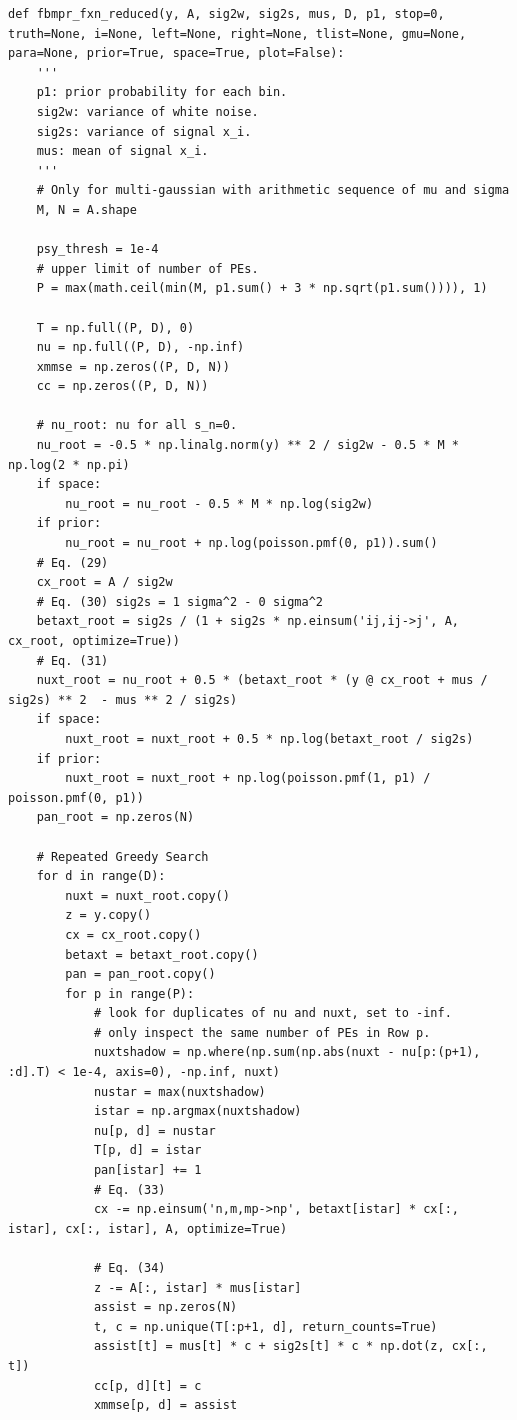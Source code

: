 \documentclass[notitlepage]{article}
\begin{document}
\begin{lstlisting}
def fbmpr_fxn_reduced(y, A, sig2w, sig2s, mus, D, p1, stop=0, truth=None, i=None, left=None, right=None, tlist=None, gmu=None, para=None, prior=True, space=True, plot=False):
    '''
    p1: prior probability for each bin.
    sig2w: variance of white noise.
    sig2s: variance of signal x_i.
    mus: mean of signal x_i.
    '''
    # Only for multi-gaussian with arithmetic sequence of mu and sigma
    M, N = A.shape

    psy_thresh = 1e-4
    # upper limit of number of PEs.
    P = max(math.ceil(min(M, p1.sum() + 3 * np.sqrt(p1.sum()))), 1)

    T = np.full((P, D), 0)
    nu = np.full((P, D), -np.inf)
    xmmse = np.zeros((P, D, N))
    cc = np.zeros((P, D, N))

    # nu_root: nu for all s_n=0.
    nu_root = -0.5 * np.linalg.norm(y) ** 2 / sig2w - 0.5 * M * np.log(2 * np.pi)
    if space:
        nu_root = nu_root - 0.5 * M * np.log(sig2w)
    if prior:
        nu_root = nu_root + np.log(poisson.pmf(0, p1)).sum()
    # Eq. (29)
    cx_root = A / sig2w
    # Eq. (30) sig2s = 1 sigma^2 - 0 sigma^2
    betaxt_root = sig2s / (1 + sig2s * np.einsum('ij,ij->j', A, cx_root, optimize=True))
    # Eq. (31)
    nuxt_root = nu_root + 0.5 * (betaxt_root * (y @ cx_root + mus / sig2s) ** 2  - mus ** 2 / sig2s)
    if space:
        nuxt_root = nuxt_root + 0.5 * np.log(betaxt_root / sig2s)
    if prior:
        nuxt_root = nuxt_root + np.log(poisson.pmf(1, p1) / poisson.pmf(0, p1))
    pan_root = np.zeros(N)

    # Repeated Greedy Search
    for d in range(D):
        nuxt = nuxt_root.copy()
        z = y.copy()
        cx = cx_root.copy()
        betaxt = betaxt_root.copy()
        pan = pan_root.copy()
        for p in range(P):
            # look for duplicates of nu and nuxt, set to -inf.
            # only inspect the same number of PEs in Row p.
            nuxtshadow = np.where(np.sum(np.abs(nuxt - nu[p:(p+1), :d].T) < 1e-4, axis=0), -np.inf, nuxt)
            nustar = max(nuxtshadow)
            istar = np.argmax(nuxtshadow)
            nu[p, d] = nustar
            T[p, d] = istar
            pan[istar] += 1
            # Eq. (33)
            cx -= np.einsum('n,m,mp->np', betaxt[istar] * cx[:, istar], cx[:, istar], A, optimize=True)

            # Eq. (34)
            z -= A[:, istar] * mus[istar]
            assist = np.zeros(N)
            t, c = np.unique(T[:p+1, d], return_counts=True)
            assist[t] = mus[t] * c + sig2s[t] * c * np.dot(z, cx[:, t])
            cc[p, d][t] = c
            xmmse[p, d] = assist


\end{lstlisting}
\end{document}
